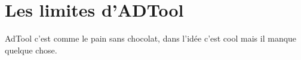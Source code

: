 \section{Les limites d'ADTool}
	\label{sec:adtool}

	AdTool c'est comme le pain sans chocolat, dans l'idée c'est cool mais il manque quelque chose.
	